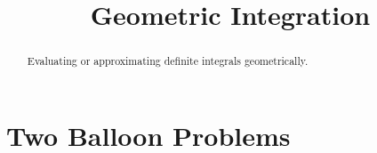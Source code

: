 \documentclass{ximera}
\title{Geometric Integration}
\begin{document}
\begin{abstract}
Evaluating or approximating definite integrals geometrically.
\end{abstract}
\maketitle


\section{Two Balloon Problems}
\end{document}

